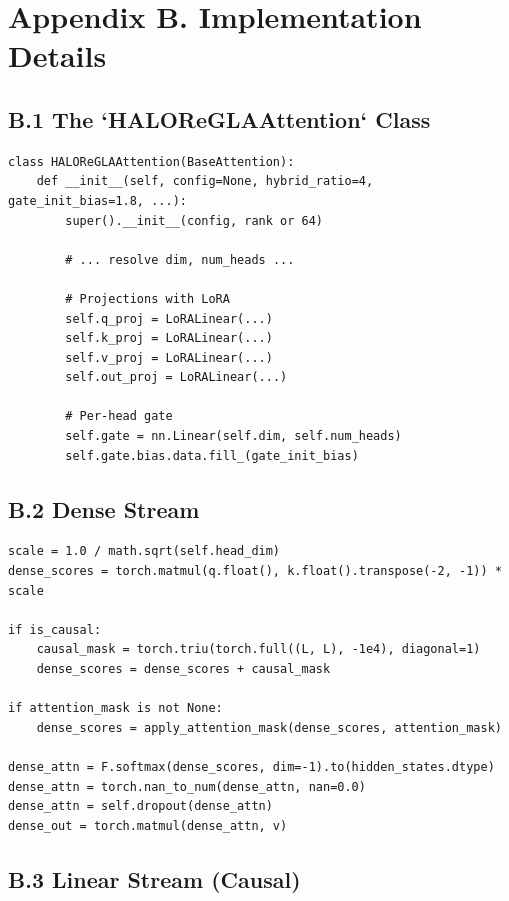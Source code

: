 
\section{Appendix B. Implementation Details}

\subsection{B.1 The `HALOReGLAAttention` Class}

\begin{lstlisting}
class HALOReGLAAttention(BaseAttention):
    def __init__(self, config=None, hybrid_ratio=4, gate_init_bias=1.8, ...):
        super().__init__(config, rank or 64)
        
        # ... resolve dim, num_heads ...
        
        # Projections with LoRA
        self.q_proj = LoRALinear(...)
        self.k_proj = LoRALinear(...)
        self.v_proj = LoRALinear(...)
        self.out_proj = LoRALinear(...)
        
        # Per-head gate
        self.gate = nn.Linear(self.dim, self.num_heads)
        self.gate.bias.data.fill_(gate_init_bias)
\end{lstlisting}

\subsection{B.2 Dense Stream}

\begin{lstlisting}
scale = 1.0 / math.sqrt(self.head_dim)
dense_scores = torch.matmul(q.float(), k.float().transpose(-2, -1)) * scale

if is_causal:
    causal_mask = torch.triu(torch.full((L, L), -1e4), diagonal=1)
    dense_scores = dense_scores + causal_mask

if attention_mask is not None:
    dense_scores = apply_attention_mask(dense_scores, attention_mask)

dense_attn = F.softmax(dense_scores, dim=-1).to(hidden_states.dtype)
dense_attn = torch.nan_to_num(dense_attn, nan=0.0)
dense_attn = self.dropout(dense_attn)
dense_out = torch.matmul(dense_attn, v)
\end{lstlisting}

\subsection{B.3 Linear Stream (Causal)}


